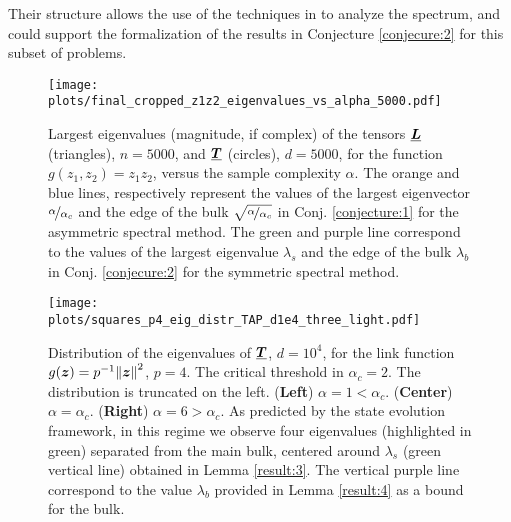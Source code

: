 Their structure allows the use of the techniques in \cite{mondelli18a,Lu2019} to analyze the spectrum, and could support the formalization of the results in Conjecture \ref{conjecure:2} for this subset of problems.
\begin{figure}[h]
    \centering
    \vspace{-0.2cm} 
\texttt{[image: plots/final\_cropped\_z1z2\_eigenvalues\_vs\_alpha\_5000.pdf]}
    \caption{Largest eigenvalues (magnitude, if complex) of the tensors ${\underline{\bm{L}}}$ (triangles), $n = 5000$, and ${\underline{\bm{T}}}$ (circles), $d = 5000$, for the function $g(z_1,z_2) = z_1z_2$, versus the sample complexity $\alpha$.     The orange and blue lines, respectively represent the values of the largest eigenvector $\nicefrac{\alpha}{\alpha_c}$ and the  edge of the bulk $\sqrt{\nicefrac{\alpha}{\alpha_c}}$ in Conj. \ref{conjecture:1} for the asymmetric spectral method. The green and purple line correspond to the values of the largest eigenvalue $\lambda_s$ and the edge of the bulk $\lambda_b$ in Conj. \ref{conjecure:2} for the symmetric spectral method. 
    \label{fig:eigenvalues_vs_alpha_z1z2}}
        \vspace{-0.2cm} 
\end{figure}

\begin{figure*}[t]
    \centering
    \texttt{[image: plots/squares\_p4\_eig\_distr\_TAP\_d1e4\_three\_light.pdf]}
    \caption{Distribution of the eigenvalues of ${\underline{\bm{T}}}$, $d = 10^4$, for the link function $g({\boldsymbol z})=p^{-1}\norm{{\boldsymbol z}}^2$, $p=4$. The critical threshold in $\alpha_c = 2$. The distribution is truncated on the left. (\textbf{Left}) $\alpha = 1 < \alpha_c$. (\textbf{Center}) $\alpha = \alpha_c$.  (\textbf{Right}) $\alpha = 6 > \alpha_c$. As predicted by the state evolution framework, in this regime we observe four eigenvalues (highlighted in green) separated from the main bulk, centered around $\lambda_s$ (green vertical line) obtained in Lemma \ref{result:3}. The vertical purple line correspond to the value $\lambda_b$ provided in Lemma \ref{result:4} as a bound for the bulk.}
    \label{fig:eigenvalues_ditribution_TAP}
\end{figure*}
